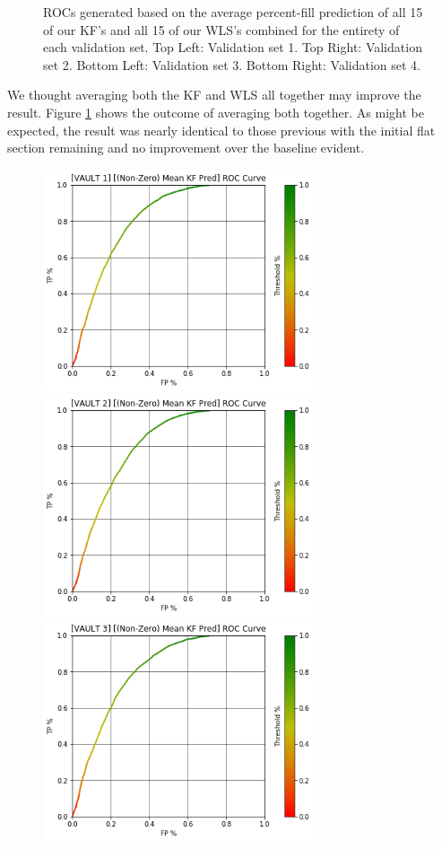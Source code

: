 \begin{figure}[h]
\caption{ROCs generated based on the average percent-fill prediction of all 15 of our KF's and all 15 of our WLS's combined for the entirety of each validation set. Top Left: Validation set 1. Top Right: Validation set 2. Bottom Left: Validation set 3. Bottom Right: Validation set 4.}
\label{fig:averageComb0}
\end{figure}

We thought averaging both the KF and WLS all together may improve the result. Figure \ref{fig:averageComb0} shows the outcome of averaging both together. As might be expected, the result was nearly identical to those previous with the initial flat section remaining and no improvement over the baseline evident.

\pagebreak

\begin{figure}[h]
\centering
\includegraphics[width=8cm]{body/results/Graphs/JustSeries/1.PerformaceofMean/1.KF/Non-Zero/KFn0v1.png}
\includegraphics[width=8cm]{body/results/Graphs/JustSeries/1.PerformaceofMean/1.KF/Non-Zero/KFn0v2.png}
\includegraphics[width=8cm]{body/results/Graphs/JustSeries/1.PerformaceofMean/1.KF/Non-Zero/KFn0v3.png}

\end{figure}
